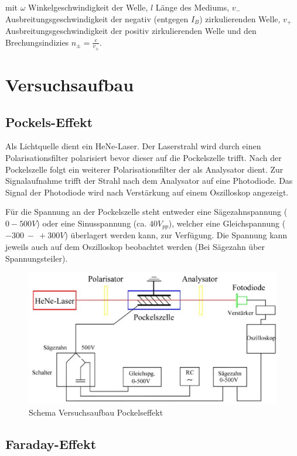 \documentclass[12pt]{article}
\begin{document}
mit $\omega$ Winkelgeschwindigkeit der Welle, $l$ Länge des Mediums, $v_-$ Ausbreitungsgeschwindigkeit der negativ (entgegen $I_B$) zirkulierenden Welle, $v_+$ Ausbreitungsgeschwindigkeit der positiv zirkulierenden Welle und den Brechungsindizies $n_\pm = \frac{c}{v_\pm}$.




\section{Versuchsaufbau}

\subsection{Pockels-Effekt}

Als Lichtquelle dient ein HeNe-Laser. Der Laserstrahl wird durch einen Polarisationsfilter polarisiert bevor dieser auf die Pockelszelle trifft. Nach der Pockelszelle folgt ein weiterer Polarisationsfilter der als Analysator dient. Zur Signalaufnahme trifft der Strahl nach dem Analysator auf eine Photodiode. Das Signal der Photodiode wird nach Verstärkung auf einem Oszilloskop angezeigt.

Für die Spannung an der Pockelszelle steht entweder eine Sägezahnspannung ($0 - 500V$) oder eine Sinusspannung (ca. $40V_{pp}$), welcher eine Gleichspannung ($-300~-~+300V$) überlagert werden kann, zur Verfügung. Die Spannung kann jeweils auch auf dem Oszilloskop beobachtet werden (Bei Sägezahn über Spannungsteiler).

\begin{figure}[H]
\centering
\includegraphics[width=0.9\linewidth]{pictures/aufbau-pockels.eps}
\caption{Schema Versuchsaufbau Pockelseffekt}
\end{figure}

\subsection{Faraday-Effekt}
\end{document}
